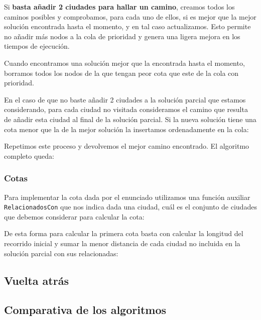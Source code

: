 Si \textbf{basta añadir 2 ciudades para hallar un camino}, creamos todos los caminos posibles y comprobamos, para cada uno de ellos, si es mejor que la mejor solución encontrada hasta el momento, y en tal caso actualizamos. Esto permite no añadir más nodos a la cola de prioridad y genera una ligera mejora en los tiempos de ejecución.


Cuando encontramos una solución mejor que la encontrada hasta el momento, borramos todos los nodos de la que tengan peor cota que este de la cola con prioridad.

En el caso de que no baste añadir 2 ciudades a la solución parcial que estamos considerando, para cada ciudad no visitada consideramos el camino que resulta de añadir esta ciudad al final de la solución parcial. Si la nueva solución tiene una cota menor que la de la mejor solución la insertamos ordenadamente en la cola:


Repetimos este proceso y devolvemos el mejor camino encontrado. El algoritmo completo queda:


\subsubsection{Cotas}

Para implementar la cota dada por el enunciado utilizamos una función auxiliar \texttt{RelacionadosCon} que nos indica dada una ciudad, cuál es el conjunto de ciudades que debemos considerar para calcular la cota:



De esta forma para calcular la primera cota basta con calcular la longitud del recorrido inicial y sumar la menor distancia de cada ciudad no incluida en la solución parcial con sus relacionadas:





\subsection{Vuelta atrás}


\subsection{Comparativa de los algoritmos}

